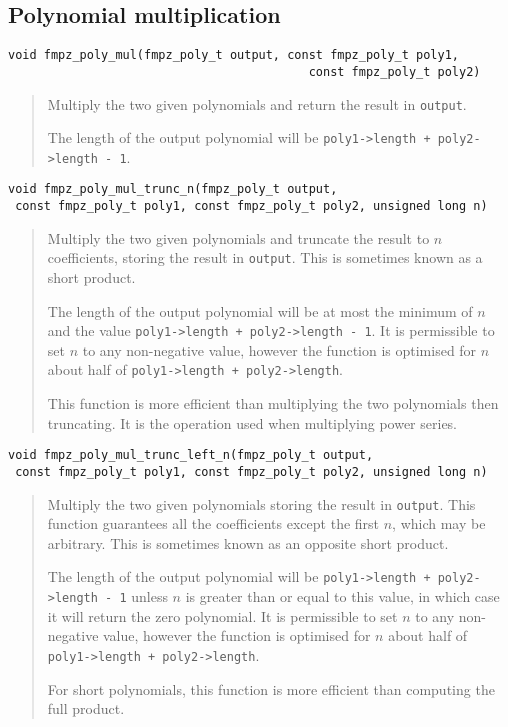 \documentclass[a4paper,10pt]{article}
\newcommand{\code}{\lstinline}
\begin{document}
\subsection{Polynomial multiplication}

\begin{lstlisting}
void fmpz_poly_mul(fmpz_poly_t output, const fmpz_poly_t poly1, 
                                          const fmpz_poly_t poly2) 
\end{lstlisting}
\begin{quote}
Multiply the two given polynomials and return the result in \code{output}.

The length of the output polynomial will be \code{poly1->length + poly2->length - 1}.
\end{quote}

\begin{lstlisting}
void fmpz_poly_mul_trunc_n(fmpz_poly_t output, 
 const fmpz_poly_t poly1, const fmpz_poly_t poly2, unsigned long n) 
\end{lstlisting}
\begin{quote}
Multiply the two given polynomials and truncate the result to $n$ coefficients, storing the result in \code{output}. This is sometimes known as a short product.

The length of the output polynomial will be at most the minimum of $n$ and the value \code{poly1->length + poly2->length - 1}. It is permissible to set $n$ to any non-negative value, however the function is optimised for $n$ about half of \code{poly1->length + poly2->length}.

This function is more efficient than multiplying the two polynomials then truncating. It is the operation used when multiplying power series.
\end{quote}

\begin{lstlisting}
void fmpz_poly_mul_trunc_left_n(fmpz_poly_t output, 
 const fmpz_poly_t poly1, const fmpz_poly_t poly2, unsigned long n) 
\end{lstlisting}
\begin{quote}
Multiply the two given polynomials storing the result in \code{output}. This function guarantees all the coefficients except the first $n$, which may be arbitrary. This is sometimes known as an opposite short product.

The length of the output polynomial will be \code{poly1->length + poly2->length - 1} unless $n$ is greater than or equal to this value, in which case it will return the zero polynomial. It is permissible to set $n$ to any non-negative value, however the function is optimised for $n$ about half of \code{poly1->length + poly2->length}.

For short polynomials, this function is more efficient than computing the full product.
\end{quote}
\end{document}
